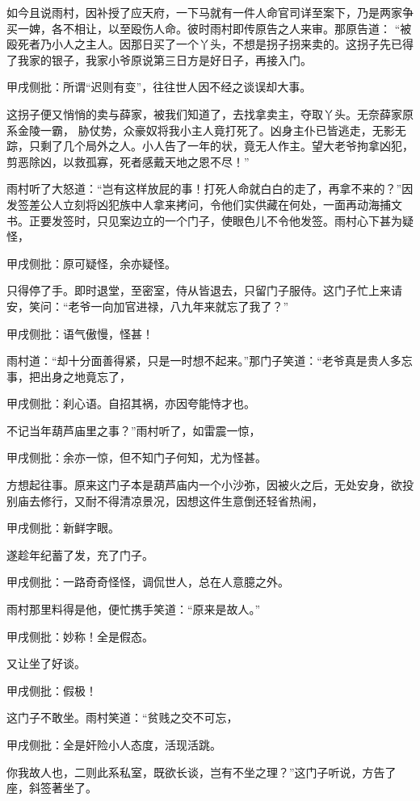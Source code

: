 \begin{parag}
    如今且说雨村，因补授了应天府，一下马就有一件人命官司详至案下，乃是两家争买一婢，各不相让，以至殴伤人命。彼时雨村即传原告之人来审。那原告道： “被殴死者乃小人之主人。因那日买了一个丫头，不想是拐子拐来卖的。这拐子先已得了我家的银子，我家小爷原说第三日方是好日子，再接入门。\begin{note}甲戌侧批：所谓“迟则有变”，往往世人因不经之谈误却大事。\end{note}这拐子便又悄悄的卖与薛家，被我们知道了，去找拿卖主，夺取丫头。无奈薛家原系金陵一霸， 胁仗势，众豪奴将我小主人竟打死了。凶身主仆已皆逃走，无影无踪，只剩了几个局外之人。小人告了一年的状，竟无人作主。望大老爷拘拿凶犯，剪恶除凶，以救孤寡，死者感戴天地之恩不尽！”
\end{parag}


\begin{parag}
    雨村听了大怒道：“岂有这样放屁的事！打死人命就白白的走了，再拿不来的？”因发签差公人立刻将凶犯族中人拿来拷问，令他们实供藏在何处，一面再动海捕文书。正要发签时，只见案边立的一个门子，使眼色儿不令他发签。雨村心下甚为疑怪，\begin{note}甲戌侧批：原可疑怪，余亦疑怪。\end{note}只得停了手。即时退堂，至密室，侍从皆退去，只留门子服侍。这门子忙上来请安，笑问：“老爷一向加官进禄，八九年来就忘了我了？”\begin{note}甲戌侧批：语气傲慢，怪甚！\end{note}雨村道：“却十分面善得紧，只是一时想不起来。”那门子笑道：“老爷真是贵人多忘事，把出身之地竟忘了，\begin{note}甲戌侧批：刹心语。自招其祸，亦因夸能恃才也。\end{note}不记当年葫芦庙里之事？”雨村听了，如雷震一惊，\begin{note}甲戌侧批：余亦一惊，但不知门子何知，尤为怪甚。\end{note}方想起往事。原来这门子本是葫芦庙内一个小沙弥，因被火之后，无处安身，欲投别庙去修行，又耐不得清凉景况，因想这件生意倒还轻省热闹，\begin{note}甲戌侧批：新鲜字眼。\end{note}遂趁年纪蓄了发，充了门子。\begin{note}甲戌侧批：一路奇奇怪怪，调侃世人，总在人意臆之外。\end{note}雨村那里料得是他，便忙携手笑道：“原来是故人。”\begin{note}甲戌侧批：妙称！全是假态。\end{note}又让坐了好谈。\begin{note}甲戌侧批：假极！\end{note}这门子不敢坐。雨村笑道：“贫贱之交不可忘，\begin{note}甲戌侧批：全是奸险小人态度，活现活跳。\end{note}你我故人也，二则此系私室，既欲长谈，岂有不坐之理？”这门子听说，方告了座，斜签著坐了。
\end{parag}


